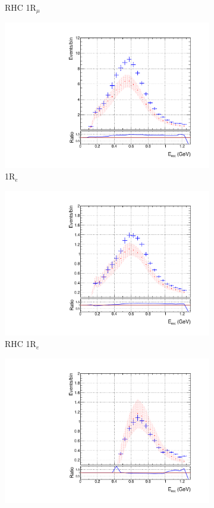 \begin{figure}
\begin{subfigure}{.49\textwidth}
   \caption{RHC 1R$_{\mu}$}
  \label{fig:skppnumubar}
\end{subfigure}
\begin{subfigure}{.49\textwidth}
  \centering
  \includegraphics[width=0.95\linewidth]{figs/skspecnue}
  \caption{1R$_{e}$}
  \label{fig:skppnumu}
\end{subfigure}
\begin{subfigure}{.49\textwidth}
  \centering
  \includegraphics[width=0.95\linewidth]{figs/skspecnuebar}
   \caption{RHC 1R$_{e}$}
  \label{fig:skppnuebar}
  \end{subfigure}
\begin{subfigure}{.49\textwidth}
  \centering
  \includegraphics[width=0.95\linewidth]{figs/skspecnue1pi}

\end{subfigure}
\end{figure}
